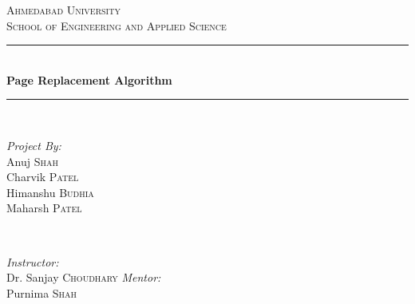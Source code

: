\documentclass[12pt]{article}
\begin{document}
	
	\begin{titlepage}
		
		\newcommand{\HRule}{\rule{\linewidth}{0.5mm}} %
		
		\center %
		
		
		\textsc{\LARGE Ahmedabad University}\\[1.5cm] %
		\textsc{\Large School of Engineering and Applied Science}\\[0.5cm] %
		
		
		
		\HRule \\[0.4cm]
		{ \huge \bfseries Page Replacement Algorithm}\\[0.4cm] %
		\HRule \\[1.5cm]
		
		
		\begin{minipage}{0.4\textwidth}
			\begin{flushleft} \large
				\emph{Project By:}\\
				Anuj \textsc{Shah} %
				\\Charvik \textsc{Patel}%
				\\Himanshu \textsc{Budhia}%
				\\Maharsh \textsc{Patel}%
			\end{flushleft}
		\end{minipage}
		~
		\begin{minipage}{0.4\textwidth}
			\begin{flushright} \large
				\emph{Instructor:} \\
				Dr. Sanjay \textsc{Choudhary} %
				\emph{Mentor:} \\
				Purnima \textsc{Shah} %
			\end{flushright}
		\end{minipage}\\[2cm]
		

\end{titlepage}
\end{document}
